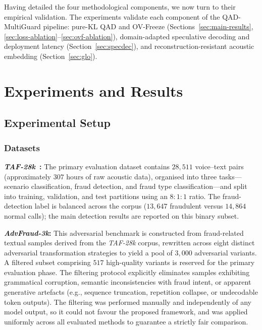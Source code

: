 \documentclass[a4paper,fleqn]{cas-sc}
\begin{document}
Having detailed the four methodological components, we now turn to their empirical validation. The experiments validate each component of the QAD-MultiGuard pipeline: pure-KL QAD and OV-Freeze (Sections~\ref{sec:main-results}, \ref{sec:loss-ablation}--\ref{sec:ovf-ablation}), domain-adapted speculative decoding and deployment latency (Section~\ref{sec:specdec}), and reconstruction-resistant acoustic embedding (Section~\ref{sec:glo}).

\section{Experiments and Results}\label{sec:experiments}
\subsection{Experimental Setup}

\subsubsection{Datasets}

\textbf{\textit{TAF-28k}~\citep{1}:} The primary evaluation dataset contains $28{,}511$ voice--text pairs (approximately $307\text{~hours}$ of raw acoustic data), organised into three tasks---scenario classification, fraud detection, and fraud type classification---and split into training, validation, and test partitions using an $8{:}1{:}1$ ratio. The fraud-detection label is balanced across the corpus ($13{,}647$ fraudulent versus $14{,}864$ normal calls); the main detection results are reported on this binary subset.

\textbf{\textit{AdvFraud-3k}:} This adversarial benchmark is constructed from fraud-related textual samples derived from the \textit{TAF-28k} corpus, rewritten across eight distinct adversarial transformation strategies to yield a pool of $3{,}000$ adversarial variants. A filtered subset comprising $517$ high-quality variants is reserved for the primary evaluation phase. The filtering protocol explicitly eliminates samples exhibiting grammatical corruption, semantic inconsistencies with fraud intent, or apparent generative artefacts (e.g., sequence truncation, repetition collapse, or undecodable token outputs). The filtering was performed manually and independently of any model output, so it could not favour the proposed framework, and was applied uniformly across all evaluated methods to guarantee a strictly fair comparison.
\end{document}
